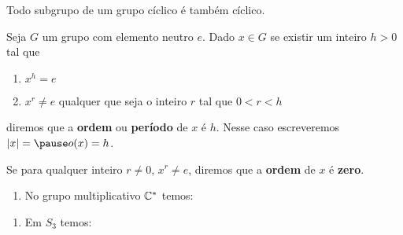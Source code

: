 \documentclass{beamer}
\begin{document}
    \begin{frame}
        \begin{proposicao}
            Todo subgrupo de um grupo cíclico é também cíclico.
        \end{proposicao}
    \end{frame}

    \begin{frame}
        \begin{definicao}
            Seja $G$ um grupo com elemento neutro $e$. \pause Dado $x \in G$ \pause se existir um inteiro $h > 0$ \pause tal que \pause
            \begin{enumerate}[label={\roman*})]
                \item $x^h = e$ \pause
                \item $x^r \ne e$ \pause qualquer que seja o inteiro $r$ \pause tal que $0 < r < h$\pause
            \end{enumerate}
            diremos que a \textbf{ordem} \pause ou \textbf{período} \pause de $x$ é $h$. \pause Nesse caso escreveremos $|x| = \pause o(x) = h$. \pause

            Se para qualquer inteiro \pause $r \ne 0$, \pause $x^r \ne e$, \pause diremos que a \textbf{ordem} de $x$ é \textbf{zero}.
        \end{definicao}
    \end{frame}

    \begin{frame}
        \begin{exemplos}
            \begin{enumerate}[label={\roman*})]
                \item No grupo multiplicativo $\mathbb{C}^*$ temos:
                \seti
            \end{enumerate}
        \end{exemplos}
    \end{frame}

    \begin{frame}
        \begin{exemplos}
            \begin{enumerate}[label={\roman*})]
                \conti
                \item Em $S_3$ temos:
                \seti
            \end{enumerate}
        \end{exemplos}
    \end{frame}
\end{document}
